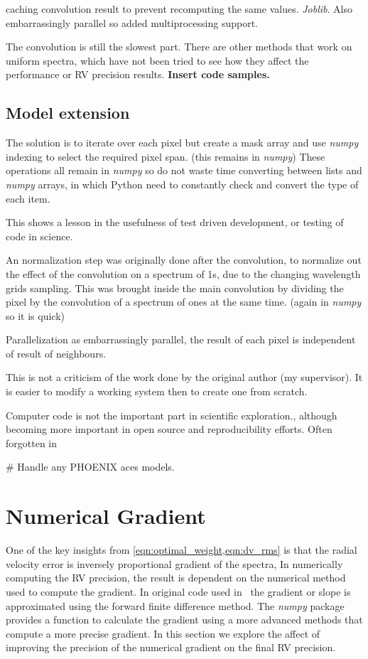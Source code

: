 caching convolution result to prevent recomputing the same values. \emph{Joblib}.  Also embarrassingly parallel so added multiprocessing support.

The convolution is still the slowest part.
There are other methods that work on uniform spectra, which have not been tried to see how they affect the performance or {RV} precision results.
\textbf{Insert code samples.}


\subsection{Model extension}
The solution is to iterate over each pixel but create a mask array and use \emph{numpy} indexing to select the required pixel span. (this remains in \emph{numpy})
These operations all remain in \emph{numpy} so do not waste time converting between lists and \emph{numpy} arrays, in which Python need to constantly check and convert the type of each item.

This shows a lesson in the usefulness of test driven development, or testing of code in science.


An normalization step was originally done after the convolution, to normalize out the effect of the convolution on a spectrum of 1s, due to the changing wavelength grids sampling.
This was brought inside the main convolution by dividing the pixel by the convolution of a spectrum of ones at the same time. (again in \emph{numpy} so it is quick)

Parallelization as embarrassingly parallel, the result of each pixel is independent of result of neighbours.

This is not a criticism of the work done by the original author (my supervisor).
It is easier to modify a working system then to create one from scratch.

Computer code is not the important part in scientific exploration., although becoming more important in open source and reproducibility efforts.
Often forgotten in

\# Handle any {PHOENIX} aces models.


\section{Numerical Gradient}
\label{sec:numerical_gradient}
One of the key insights from \cref{eqn:optimal_weight,eqn:dv_rms} is that the radial velocity error is inversely proportional gradient of the spectra, In numerically computing the {RV} precision, the result is dependent on the numerical method used to compute the gradient.
In original code used in~\citet{figueira_radial_2016} the gradient or slope is approximated using the forward finite difference method.
The \emph{numpy} package provides a function to calculate the gradient using a more advanced methods that compute a more precise gradient.
In this section we explore the affect of improving the precision of the numerical gradient on the final {RV} precision.

